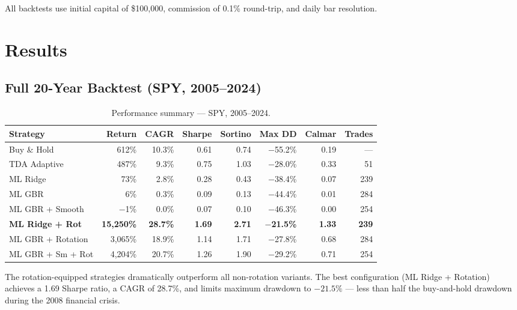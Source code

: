 \documentclass[11pt, a4paper]{article}
\begin{document}
All backtests use initial capital of \$100{,}000, commission of 0.1\% round-trip, and daily bar resolution.

\section{Results}

\subsection{Full 20-Year Backtest (SPY, 2005--2024)}

\begin{table}[H]
\centering
\caption{Performance summary --- SPY, 2005--2024.}
\label{tab:spy20}
\begin{tabular}{lrrrrrrr}
\toprule
\textbf{Strategy} & \textbf{Return} & \textbf{CAGR} & \textbf{Sharpe} & \textbf{Sortino} & \textbf{Max DD} & \textbf{Calmar} & \textbf{Trades} \\
\midrule
Buy \& Hold         & 612\%   & 10.3\% & 0.61 & 0.74 & $-$55.2\% & 0.19 & ---  \\
TDA Adaptive        & 487\%   & 9.3\%  & 0.75 & 1.03 & $-$28.0\% & 0.33 & 51   \\
ML Ridge            & 73\%    & 2.8\%  & 0.28 & 0.43 & $-$38.4\% & 0.07 & 239  \\
ML GBR              & 6\%     & 0.3\%  & 0.09 & 0.13 & $-$44.4\% & 0.01 & 284  \\
ML GBR + Smooth     & $-$1\%  & 0.0\%  & 0.07 & 0.10 & $-$46.3\% & 0.00 & 254  \\
\textbf{ML Ridge + Rot}     & \textbf{15{,}250\%} & \textbf{28.7\%} & \textbf{1.69} & \textbf{2.71} & $-$\textbf{21.5\%} & \textbf{1.33} & \textbf{239} \\
ML GBR + Rotation   & 3{,}065\% & 18.9\% & 1.14 & 1.71 & $-$27.8\% & 0.68 & 284 \\
ML GBR + Sm + Rot   & 4{,}204\% & 20.7\% & 1.26 & 1.90 & $-$29.2\% & 0.71 & 254 \\
\bottomrule
\end{tabular}
\end{table}

The rotation-equipped strategies dramatically outperform all non-rotation variants. The best configuration (ML Ridge + Rotation) achieves a 1.69 Sharpe ratio, a CAGR of 28.7\%, and limits maximum drawdown to $-21.5\%$ --- less than half the buy-and-hold drawdown during the 2008 financial crisis.
\end{document}
